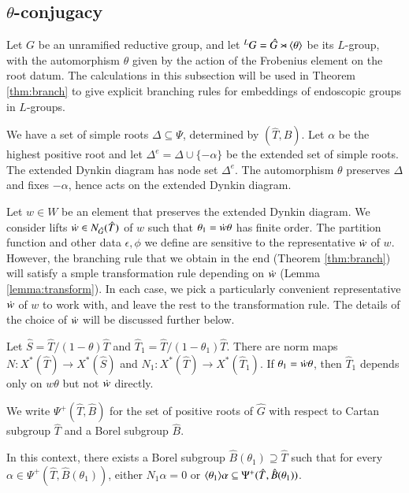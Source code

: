 \subsection{$\theta$-conjugacy}

Let $G$ be an unramified reductive group, and let ${}^LG = \hat G
\rtimes \langle{\theta}\rangle$ be its $L$-group, with the automorphism $\theta$
given by the action of the Frobenius element on the root datum.  
The calculations in this subsection will be used in Theorem
\ref{thm:branch} to give explicit branching rules for embeddings of
endoscopic groups in $L$-groups.

We have a  set of simple roots $\Delta\subseteq \Psi$, determined by $(\hat T,\hat
B)$.  Let $\alpha$ be the highest positive root and let $\Delta^e =
\Delta \cup \{-\alpha\}$ be the extended set of simple roots.  The
extended Dynkin diagram has node set $\Delta^e$.  The automorphism
$\theta$ preserves $\Delta$ and fixes $-\alpha$, hence acts on the
extended Dynkin diagram.

Let $w\in W$ be an element that preserves the extended Dynkin diagram.
We consider lifts $\dot w\in N_{\hat G}(\hat T)$ of $w$ such that
$\theta_1 = \dot w \theta$ has finite order.  The partition function
and other data $\epsilon,\phi$ we define are sensitive to the
representative $\dot w$ of $w$.  However, the branching rule that we
obtain in the end (Theorem \ref{thm:branch}) will satisfy a smple transformation
rule depending on $\dot w$ (Lemma \ref{lemma:transform}). 
In each case, we pick a particularly convenient representative $\dot w$
of $w$ to work with, and leave the rest to the transformation rule.  
The details of the choice of $\dot w$ will be
discussed further below.

Let $\hat S = \hat T/(1-\theta)\hat T$ and $\hat T_1 = \hat
T/(1-\theta_1)\hat T$.  There are norm maps $N:X^*(\hat T)\to X^*(\hat
S)$ and $N_1:X^*(\hat T)\to X^*(\hat T_1)$.  If $\theta_1 =\dot w\theta$,
then $\hat T_1$ depends only on $w\theta$ but not $\dot w$ directly.


We write $\Psi^+(\hat T,\hat B)$ for the set of positive roots of
$\hat G$ with respect to Cartan subgroup $\hat T$ and a Borel subgroup
$\hat B$.

\begin{lemma}\label{lemma:adapted}
  In this context, there exists a Borel subgroup $\hat
  B(\theta_1)\supseteq \hat T$ such that for every
  $\alpha\in\Psi^+(\hat T,\hat B(\theta_1))$, either $N_1\alpha = 0$
  or $\langle{\theta_1}\rangle\alpha\subseteq \Psi^+(\hat T,\hat B(\theta_1))$.
\end{lemma}


